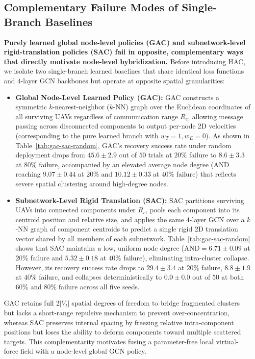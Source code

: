 \documentclass[11pt]{article}
\theoremstyle{plain}
\theoremstyle{definition}
\theoremstyle{remark}
\begin{document}
\subsection{Complementary Failure Modes of Single-Branch Baselines}
\label{sec:gac}
\label{sec:sac}
\label{sec:takeaway}
\textbf{Purely learned global node-level policies (GAC) and subnetwork-level rigid-translation policies (SAC) fail in opposite, complementary ways that directly motivate node-level hybridization.} Before introducing HAC, we isolate two single-branch learned baselines that share identical loss functions and $4$-layer GCN backbones but operate at opposite spatial granularities:
\begin{itemize}[nosep]
  \item \textbf{Global Node-Level Learned Policy (GAC):} GAC constructs a symmetric $k$-nearest-neighbor ($k$-NN) graph over the Euclidean coordinates of all surviving UAVs regardless of communication range $R_c$, allowing message passing across disconnected components to output per-node 2D velocities (corresponding to the pure learned branch with $w_T=1, w_E=0$). As shown in Table~\ref{tab:gac-sac-random}, GAC's recovery success rate under random deployment drops from $45.6 \pm 2.9$ out of $50$ trials at $20\%$ failure to $8.6 \pm 3.3$ at $80\%$ failure, accompanied by an elevated average node degree ($\mathrm{AND}$ reaching $9.07 \pm 0.44$ at $20\%$ and $10.12 \pm 0.33$ at $40\%$ failure) that reflects severe spatial clustering around high-degree nodes.
  \item \textbf{Subnetwork-Level Rigid Translation (SAC):} SAC partitions surviving UAVs into connected components under $R_c$, pools each component into its centroid position and relative size, and applies the same $4$-layer GCN over a $k$-NN graph of component centroids to predict a single rigid 2D translation vector shared by all members of each subnetwork. Table~\ref{tab:gac-sac-random} shows that SAC maintains a low, uniform node degree ($\mathrm{AND} = 6.71 \pm 0.09$ at $20\%$ failure and $5.32 \pm 0.18$ at $40\%$ failure), eliminating intra-cluster collapse. However, its recovery success rate drops to $29.4 \pm 3.4$ at $20\%$ failure, $8.8 \pm 1.9$ at $40\%$ failure, and collapses deterministically to $0.0 \pm 0.0$ out of $50$ at both $60\%$ and $80\%$ failure across all five seeds.
\end{itemize}
GAC retains full $2|V_t|$ spatial degrees of freedom to bridge fragmented clusters but lacks a short-range repulsive mechanism to prevent over-concentration, whereas SAC preserves internal spacing by freezing relative intra-component positions but loses the ability to deform components toward multiple scattered targets. This complementarity motivates fusing a parameter-free local virtual-force field with a node-level global GCN policy.
\end{document}
